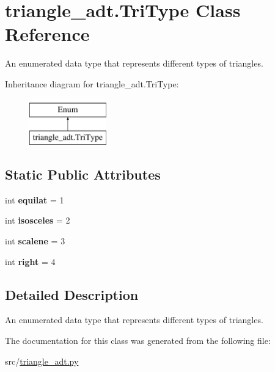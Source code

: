 \hypertarget{classtriangle__adt_1_1_tri_type}{}\section{triangle\+\_\+adt.\+Tri\+Type Class Reference}
\label{classtriangle__adt_1_1_tri_type}


An enumerated data type that represents different types of triangles.  


Inheritance diagram for triangle\+\_\+adt.\+Tri\+Type\+:\begin{figure}[H]
\begin{center}
\leavevmode
\includegraphics[height=2.000000cm]{classtriangle__adt_1_1_tri_type}
\end{center}
\end{figure}
\subsection*{Static Public Attributes}
\begin{DoxyCompactItemize}
\item 
\mbox{\label{classtriangle__adt_1_1_tri_type_a0eb98494388109343f9f159cc19db806}} 
int {\bfseries equilat} = 1
\item 
\mbox{\label{classtriangle__adt_1_1_tri_type_a4365f5f84ae196c8a683a2410047d151}} 
int {\bfseries isosceles} = 2
\item 
\mbox{\label{classtriangle__adt_1_1_tri_type_a02b27c62da67a95c7721c164b2671298}} 
int {\bfseries scalene} = 3
\item 
\mbox{\label{classtriangle__adt_1_1_tri_type_a194e9713b488d32aac5554803dc2ddba}} 
int {\bfseries right} = 4
\end{DoxyCompactItemize}


\subsection{Detailed Description}
An enumerated data type that represents different types of triangles. 



The documentation for this class was generated from the following file\+:\begin{DoxyCompactItemize}
\item 
src/\hyperlink{triangle__adt_8py}{triangle\+\_\+adt.\+py}\end{DoxyCompactItemize}
